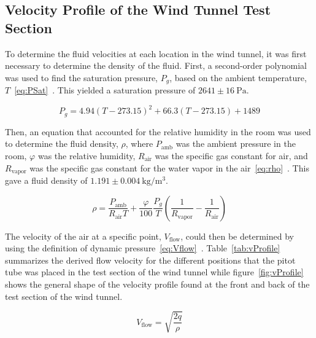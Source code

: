 \documentclass[journal,letterpaper]{IEEEtran}
\begin{document}
\subsection{Velocity Profile of the Wind Tunnel Test Section}

To determine the fluid velocities at each location in the wind tunnel, it was first necessary to determine the density of the fluid.
First, a second-order polynomial was used to find the saturation pressure, $P_g$, based on the ambient temperature, $T$~\eqref{eq:PSat}~\cite{calculator}.
This yielded a saturation pressure of $2641 \pm \qty{16}{\pascal}$.

\begin{equation} \label{eq:PSat}
    P_g = 4.94(T - 273.15)^2 + 66.3(T - 273.15) + 1489
\end{equation}

Then, an equation that accounted for the relative humidity in the room was used to determine the fluid density, $\rho$, where $P_\text{amb}$ was the ambient pressure in the room, $\varphi$ was the relative humidity, $R_\text{air}$ was the specific gas constant for air, and $R_\text{vapor}$ was the specific gas constant for the water vapor in the air~\eqref{eq:rho}~\cite{calculator}.
This gave a fluid density of $1.191 \pm \qty{0.004}{\kg\per\m\cubed}$.

\begin{equation} \label{eq:rho}
    \rho = \frac{P_\text{amb}}{R_\text{air} T} + \frac{\varphi}{100}\frac{P_g}{T}\left(\frac{1}{R_\text{vapor}} - \frac{1}{R_\text{air}}\right)
\end{equation}

The velocity of the air at a specific point, $V_\text{flow}$, could then be determined by using the definition of dynamic pressure~\eqref{eq:Vflow}~\cite{lecture}.
Table~\ref{tab:vProfile} summarizes the derived flow velocity for the different positions that the pitot tube was placed in the test section of the wind tunnel while figure~\ref{fig:vProfile} shows the general shape of the velocity profile found at the front and back of the test section of the wind tunnel.

\begin{equation} \label{eq:Vflow}
    V_\text{flow} = \sqrt{\frac{2q}{\rho}}
\end{equation}
\end{document}
